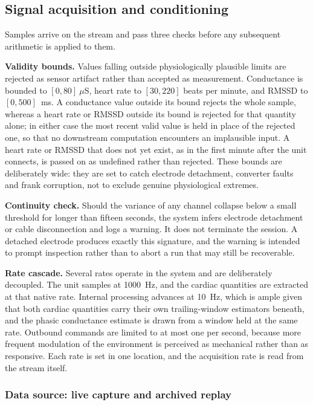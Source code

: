 \subsection{Signal acquisition and conditioning}
\label{sec:acquisition}

Samples arrive on the stream and pass three checks before any
subsequent arithmetic is applied to them.

\textbf{Validity bounds.} Values falling outside physiologically
plausible limits are rejected as sensor artifact rather than
accepted as measurement. Conductance is bounded to
$[0, 80]~\mu$S, heart rate to $[30, 220]$ beats per minute, and
RMSSD to $[0, 500]$~ms. A conductance value outside its bound
rejects the whole sample, whereas a heart rate or RMSSD outside its
bound is rejected for that quantity alone; in either case the most
recent valid value is held in place of the rejected one, so that no
downstream computation encounters an implausible input. A heart
rate or RMSSD that does not yet exist, as in the first minute after
the unit connects, is passed on as undefined rather than rejected.
These bounds are deliberately wide: they are set to catch
electrode detachment, converter faults and frank corruption, not
to exclude genuine physiological extremes.

\textbf{Continuity check.} Should the variance of any channel
collapse below a small threshold for longer than fifteen seconds,
the system infers electrode detachment or cable disconnection and
logs a warning. It does not terminate the session. A
detached electrode produces exactly this signature, and the
warning is intended to prompt inspection rather than to abort a
run that may still be recoverable.

\textbf{Rate cascade.} Several rates operate in the system and are
deliberately decoupled. The unit samples at 1000~Hz, and the
cardiac quantities are extracted at that native rate. Internal
processing advances at 10~Hz, which is ample given that both
cardiac quantities carry their own trailing-window estimators
beneath, and the phasic conductance estimate is drawn from a
window held at the same rate. Outbound commands are limited
to at most one per second, because more frequent modulation of the
environment is perceived as mechanical rather than as responsive.
Each rate is set in one location, and the acquisition rate is read
from the stream itself.

\subsubsection{Data source: live capture and archived replay}
\label{sec:data-source}

